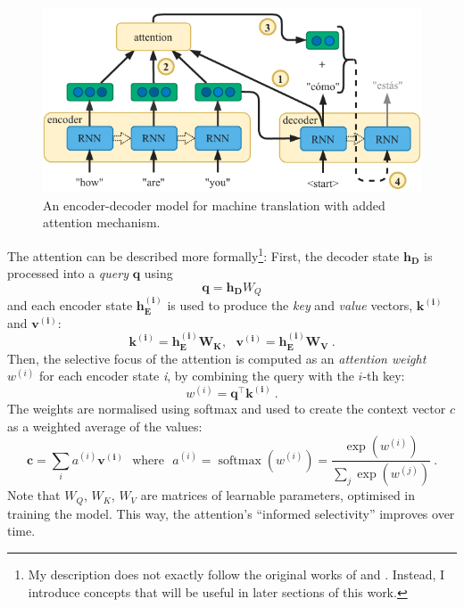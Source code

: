 \documentclass[bsc,frontabs,twoside,singlespacing,parskip,deptreport]{infthesis}
\DeclareMathOperator{\softmax}{softmax}
\begin{document}
{{    \begin{figure}[h!t]
      \centering
      \includegraphics[width=11.5cm]{graphics/encoder-decoder-att}
      \cprotect\caption{An encoder-decoder model for machine translation with added attention mechanism.}
      \label{fig:encoder-decoder-att}
    \end{figure}
    
    The attention can be described more formally\footnote{My description does not exactly follow the original works of \citet{Bahdanau_2014} and \citet{Luong_2015}. Instead, I introduce concepts that will be useful in later sections of this work.}: First, the decoder state $\bm{h_D}$ is processed into a \textit{query} $\bm{q}$ using
    \begin{equation}
    \bm{q}=\bm{h_D}W_Q
    \end{equation}
    and each encoder state $\bm{h_{E}^{(i)}}$ is used to produce the \textit{key} and \textit{value} vectors, $\bm{k^{(i)}}$ and $\bm{v^{(i)}}$:
    \begin{equation}
    \bm{k^{(i)} = h_{E}^{(i)}W_K},\ \ \ \bm{v^{(i)} = h_{E}^{(i)}W_V}\ .
    \end{equation}
    Then, the selective focus of the attention is computed as an \textit{attention weight} $w^{(i)}$ for each encoder state \textit{i}, by combining the query with the $i$-th key:
    \begin{equation}
    w^{(i)}=\bm{q^\top}\bm{k^{(i)}}\ .
    \end{equation}
    The weights are normalised using softmax and used to create the context vector $c$ as a weighted average of the values:
    \begin{equation}
    \bm{c}=\sum_{i}a^{(i)}\bm{v^{(i)}}\ \ \ \textrm{where}\ \ \ a^{(i)}=\softmax(w^{(i)})=\frac{\exp{(w^{(i)})}}{\sum_{j}\exp{(w^{(j)})}}\ .
    \end{equation}
    Note that $W_Q$, $W_K$, $W_V$ are matrices of learnable parameters, optimised in training the model. This way, the attention's ``informed selectivity'' improves over time.
    
}}
\end{document}
